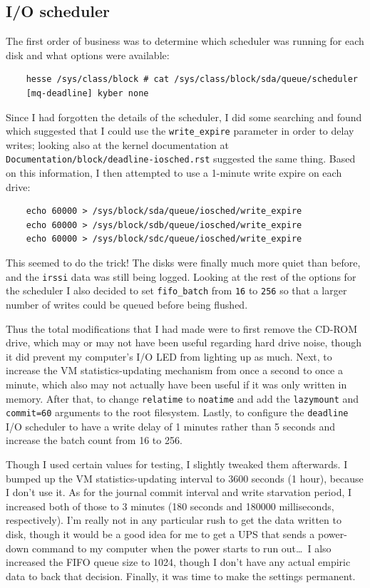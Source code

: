 \documentclass{article}
\begin{document}
\subsection{I/O scheduler}
The first order of business was to determine which scheduler was running for each disk and what options were available:
\begin{verbatim}
	hesse /sys/class/block # cat /sys/class/block/sda/queue/scheduler
	[mq-deadline] kyber none
\end{verbatim}
Since I had forgotten the details of the scheduler, I did some searching and found  which suggested that I could use the \texttt{write_expire} parameter in order to delay writes; looking also at the kernel documentation at \texttt{Documentation/block/deadline-iosched.rst} suggested the same thing.  Based on this information, I then attempted to use a 1-minute write expire on each drive:
\begin{verbatim}
	echo 60000 > /sys/block/sda/queue/iosched/write_expire
	echo 60000 > /sys/block/sdb/queue/iosched/write_expire
	echo 60000 > /sys/block/sdc/queue/iosched/write_expire
\end{verbatim}
This seemed to do the trick!  The disks were finally much more quiet than before, and the \texttt{irssi} data was still being logged.  Looking at the rest of the options for the scheduler I also decided to set \texttt{fifo_batch} from \texttt{16} to \texttt{256} so that a larger number of writes could be queued before being flushed.

Thus the total modifications that I had made were to first remove the CD-ROM drive, which may or may not have been useful regarding hard drive noise, though it did prevent my computer's I/O LED from lighting up as much.  Next, to increase the VM statistics-updating mechanism from once a second to once a minute, which also may not actually have been useful if it was only written in memory.  After that, to change \texttt{relatime} to \texttt{noatime} and add the \texttt{lazymount} and \texttt{commit=60} arguments to the root filesystem.  Lastly, to configure the \texttt{deadline} I/O scheduler to have a write delay of 1 minutes rather than 5 seconds and increase the batch count from 16 to 256.

Though I used certain values for testing, I slightly tweaked them afterwards.  I bumped up the VM statistics-updating interval to 3600 seconds (1 hour), because I don't use it.  As for the journal commit interval and write starvation period, I increased both of those to 3 minutes (180 seconds and 180000 milliseconds, respectively).  I'm really not in any particular rush to get the data written to disk, though it would be a good idea for me to get a UPS that sends a power-down command to my computer when the power starts to run out\ldots~I also increased the FIFO queue size to 1024, though I don't have any actual empiric data to back that decision.  Finally, it was time to make the settings permanent.
\end{document}
